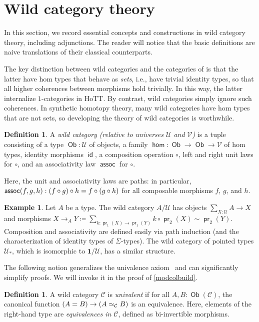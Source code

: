 \documentclass[10pt,a4paper]{article}
\theoremstyle{definition}
\newtheorem{defi}[thm]{Definition}
\newtheorem{exa}[thm]{Example}
\theoremstyle{remark}
\newcommand{\C}{\mathcal C}
\newcommand{\U}{\mathcal{U}}
\newcommand{\V}{\mathcal{V}}
\newcommand{\0}{\mathbf{0}}
\newcommand{\1}{\mathbf{1}}
\newcommand{\2}{\mathbf{2}}
\DeclareMathOperator{\assoc}{\mathsf{assoc}}
\DeclareMathOperator{\pr}{\mathsf{pr}}
\DeclareMathOperator{\homm}{\mathsf{hom}}
\DeclareMathOperator{\idd}{\mathsf{id}}
\DeclareMathOperator{\obb}{\mathsf{Ob}}
\begin{document}
\section{Wild category theory} \label{wildcats}

In this section, we record essential concepts and constructions in wild category theory, including adjunctions. The reader will notice that the basic definitions are naive translations of their classical counterparts.

The key distinction between wild categories and the categories of \cite[Section 9.1]{Uni13} is that the latter have hom types that behave as \emph{sets}, i.e., have trivial identity types, so that all higher coherences between morphisms hold trivially. In this way, the latter internalize $1$-categories in HoTT. By contrast, wild categories simply ignore such coherences. In synthetic homotopy theory, many wild categories have hom types that are not sets, so developing the theory of wild categories is worthwhile.

\begin{defi}
  A \emph{wild category (relative to universes $\U$ and $\V$)} is a tuple consisting of a type $\obb : \U$ of objects, a family $\homm : \obb \to \obb \to \V$ of hom types, identity morphisms $\idd$, a composition operation $\circ$, left and right unit laws for $\circ$, and an associativity law $\assoc$ for $\circ$.
  
  Here, the unit and associativity laws are paths: in particular, $\assoc(f,g,h) : \mleft(f \circ g\mright) \circ h = f \circ \mleft(g \circ h\mright)$ for all composable morphisms $f$, $g$, and $h$.
\end{defi}

\begin{exa}
Let $A$ be a type. The wild category $A/\U$ has objects $\sum_{X : \U}A \to X$ and morphisms $X \to_A Y \coloneqq \sum_{k : \pr_1(X) \to \pr_1(Y)}k \circ \pr_2(X) \sim \pr_2(Y)$. Composition and associativity are defined easily via path induction (and the characterization of identity types of $\Sigma$-types). The wild category of pointed types $\U_{\ast}$, which is isomorphic to $\1/\U$, has a similar structure.
\end{exa}

The following notion generalizes the univalence axiom~\cite[Axiom 2.10.3]{Uni13} and can significantly simplify proofs. We will invoke it in the proof of \autoref{modcolbuild}.
\begin{defi} \label{unvwc}
  A wild category $\C$ is \emph{univalent} if for all $A , B : \obb(\C)$, the canonical function $\mleft(A = B\mright) \to \mleft(A \simeq_{\C} B\mright)$ is an equivalence. Here, elements of the right-hand type are \emph{equivalences in $\C$}, defined as bi-invertible morphisms.
\end{defi}
\end{document}
